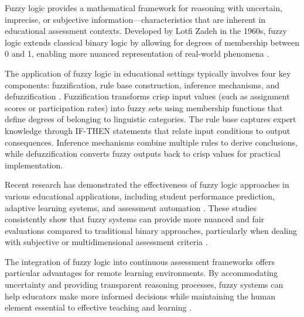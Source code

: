 Fuzzy logic provides a mathematical framework for reasoning with uncertain, imprecise, or subjective information—characteristics that are inherent in educational assessment contexts. Developed by Lotfi Zadeh in the 1960s, fuzzy logic extends classical binary logic by allowing for degrees of membership between 0 and 1, enabling more nuanced representation of real-world phenomena \cite{Santos2022}.

The application of fuzzy logic in educational settings typically involves four key components: fuzzification, rule base construction, inference mechanisms, and defuzzification \cite{Wang2023}. Fuzzification transforms crisp input values (such as assignment scores or participation rates) into fuzzy sets using membership functions that define degrees of belonging to linguistic categories. The rule base captures expert knowledge through IF-THEN statements that relate input conditions to output consequences. Inference mechanisms combine multiple rules to derive conclusions, while defuzzification converts fuzzy outputs back to crisp values for practical implementation.

Recent research has demonstrated the effectiveness of fuzzy logic approaches in various educational applications, including student performance prediction, adaptive learning systems, and assessment automation \cite{Smith2023}. These studies consistently show that fuzzy systems can provide more nuanced and fair evaluations compared to traditional binary approaches, particularly when dealing with subjective or multidimensional assessment criteria \cite{Nguyen2020}.

The integration of fuzzy logic into continuous assessment frameworks offers particular advantages for remote learning environments. By accommodating uncertainty and providing transparent reasoning processes, fuzzy systems can help educators make more informed decisions while maintaining the human element essential to effective teaching and learning \cite{Lopez2021, Black2020}.
